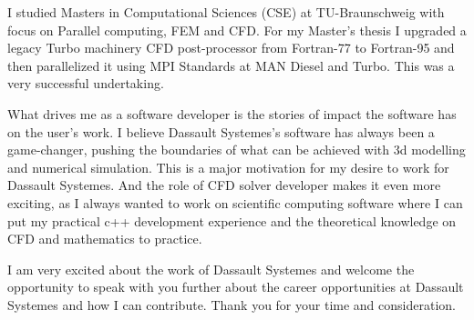 \documentclass[11pt, a4paper]{awesome-cv}
\newcommand{\company}{Dassault Systemes}
\begin{document}
\begin{cvletter}
I studied Masters in Computational Sciences (CSE) at TU-Braunschweig with focus 
on Parallel computing, FEM and CFD. For my Master's thesis I upgraded a legacy 
Turbo machinery CFD post-processor from Fortran-77 to Fortran-95 and then 
parallelized it using MPI Standards at MAN Diesel and Turbo. This was a very 
successful undertaking.     

What drives me as a software developer is the stories of impact the software has
 on the user's work. I believe \company{}'s software has always been a 
 game-changer, pushing the boundaries of what can be achieved with 3d modelling 
and numerical simulation. This is a major motivation for my desire to work for 
\company{}. And the role of CFD solver developer makes it even more exciting, 
as I always wanted to work on scientific computing software where I can put my 
practical c++ development experience and the theoretical knowledge on CFD and
mathematics to practice.


I am very excited about the work of \company{} and welcome the opportunity to 
speak with you further about the career opportunities at \company{} and how I 
can contribute. Thank you for your time and consideration. 

 
\end{cvletter}


\makeletterclosing
\end{document}
